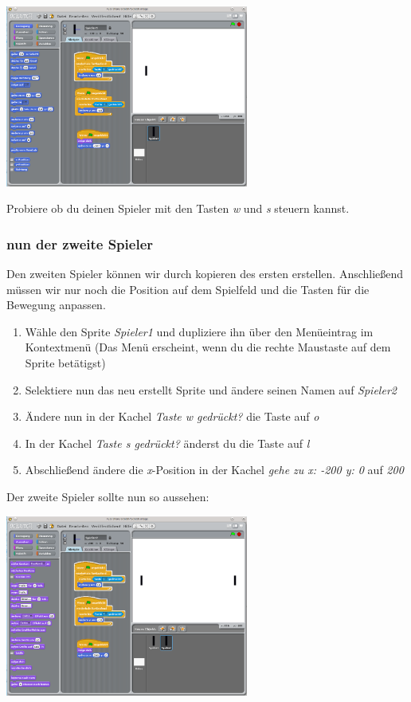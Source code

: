 \includegraphics[width=0.6\textwidth]{images/aufgabe5_pong_sprite_spieler1_3.png}

Probiere ob du deinen Spieler mit den Tasten \emph{w} und \emph{s} steuern kannst.

\subsubsection{nun der zweite Spieler}

Den zweiten Spieler können wir durch kopieren des ersten erstellen. Anschließend müssen wir nur noch die Position auf dem Spielfeld und die Tasten für die Bewegung anpassen.

\begin{enumerate}
\item Wähle den Sprite \emph{Spieler1} und dupliziere ihn über den Menüeintrag im Kontextmenü (Das Menü erscheint, wenn du die rechte Maustaste auf dem Sprite betätigst)
\item Selektiere nun das neu erstellt Sprite und ändere seinen Namen auf \emph{Spieler2}
\item Ändere nun in der Kachel \textit{Taste w gedrückt?} die Taste auf \emph{o}
\item In der Kachel \textit{Taste s gedrückt?} änderst du die Taste auf \emph{l}
\item Abschließend ändere die \emph{x}-Position in der Kachel \textit{gehe zu x: -200 y: 0} auf \emph{200}
\end{enumerate}

Der zweite Spieler sollte nun so aussehen:

\includegraphics[width=0.6\textwidth]{images/aufgabe5_pong_sprite_spieler2.png}

